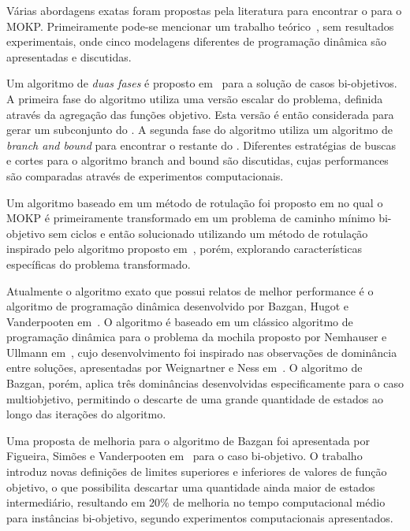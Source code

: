 
Várias abordagens exatas foram propostas pela literatura para encontrar o \paretoset{}
para o MOKP.
Primeiramente pode-se mencionar um trabalho teórico~\cite{klamroth2000dynamic},
sem resultados experimentais, onde cinco modelagens diferentes de programação dinâmica
são apresentadas e discutidas.

Um algoritmo de \emph{duas fases} é proposto em~\cite{visee1998two} para a solução de casos bi-objetivos.
A primeira fase do algoritmo utiliza uma versão escalar do problema, definida através da agregação das funções objetivo.
Esta versão é então considerada para gerar um subconjunto do \paretoset{}.
A segunda fase do algoritmo utiliza um algoritmo de \emph{branch and bound}
para encontrar o restante do \paretoset{}.
Diferentes estratégias de buscas e cortes para o algoritmo branch and bound são discutidas,
cujas performances são comparadas através de experimentos computacionais.

Um algoritmo baseado em um método de rotulação foi proposto em \cite{captivo2003solving}
no qual o MOKP é primeiramente transformado em um problema de caminho mínimo bi-objetivo
sem ciclos e então solucionado utilizando um método de
rotulação inspirado pelo algoritmo proposto em~\cite{martins1999labeling},
porém, explorando características específicas do problema transformado.

Atualmente o algoritmo exato que possui relatos de melhor performance é o algoritmo de
programação dinâmica desenvolvido por Bazgan, Hugot e Vanderpooten em~\cite{bazgan2009}.
O algoritmo é baseado em um clássico algoritmo de programação dinâmica para o problema da mochila
proposto por Nemhauser e Ullmann em~\cite{nemhauser1969discrete}, cujo desenvolvimento
foi inspirado nas observações de dominância entre soluções, apresentadas por Weignartner e Ness em~\cite{weingartner1967methods}.
O algoritmo de Bazgan, porém, aplica três dominâncias desenvolvidas especificamente para o caso multiobjetivo,
permitindo o descarte de uma grande quantidade de estados ao longo das iterações do algoritmo.

Uma proposta de melhoria para o algoritmo de Bazgan foi apresentada
por Figueira, Simões e Vanderpooten em~\cite{figueira2013algorithmic} para o caso bi-objetivo.
O trabalho introduz novas definições de limites superiores e inferiores de valores de
função objetivo, o que possibilita descartar uma quantidade ainda maior de estados
intermediário, resultando em
$20\%$ de melhoria no tempo computacional médio para instâncias bi-objetivo, segundo experimentos computacionais apresentados.

